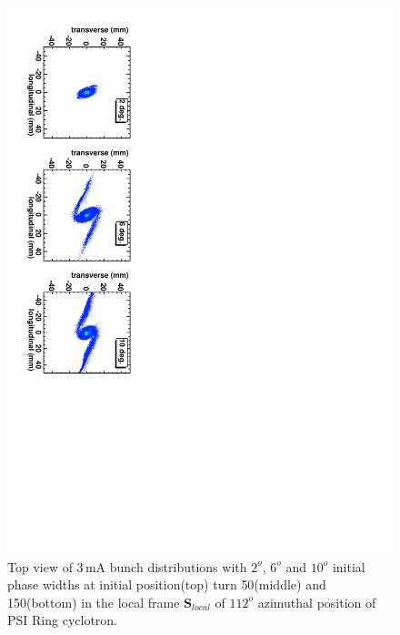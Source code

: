 \documentclass[aps,prstab,twocolumn,superscriptaddress]{revtex4}
\newcommand{\bs}[1]{\mathbf #1}
\begin{document}
\begin{figure}
  \includegraphics[angle=90,width=0.9\linewidth]{figures/Turn-150.pdf}
  \caption{Top view of 3\,mA bunch distributions with  $2^o$, $6^o$ and $10^o$ initial phase widths at initial position(top) turn 50(middle) and 150(bottom) 
    in the local frame ${\bs{S}_{local}}$ of $112^o$ azimuthal position of PSI Ring cyclotron. }
  \label{fig:RingPhaseWidth}
\end{figure}
\end{document}
